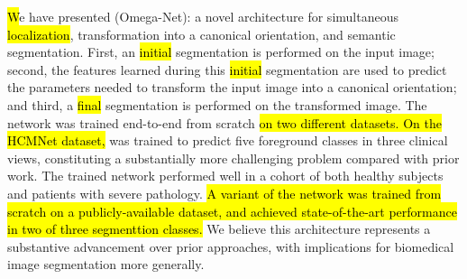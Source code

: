 
\hl{W}e have presented \omeganet{} (Omega-Net): a novel \CNN{} architecture for simultaneous \hl{localization}, transformation into a canonical orientation, and semantic segmentation.
First, an \hl{initial} segmentation is performed on the input image; second, the features learned during this \hl{initial} segmentation are used to predict the parameters needed to transform the input image into a canonical orientation; and third, a \hl{final} segmentation is performed on the transformed image.
The network was trained end-to-end from scratch \hl{on two different datasets.
On the HCMNet dataset,} \omeganet{} was trained to predict five foreground classes in three clinical views, constituting a substantially more challenging problem compared with prior work.
The trained network performed well in a cohort of both healthy subjects and patients with severe \LV{} pathology.
\hl{
A variant of the \omeganet{} network was trained from scratch on a publicly-available dataset, and achieved state-of-the-art performance in two of three segmenttion classes.
}
We believe this architecture represents a substantive advancement over prior approaches, with implications for biomedical image segmentation more generally.


